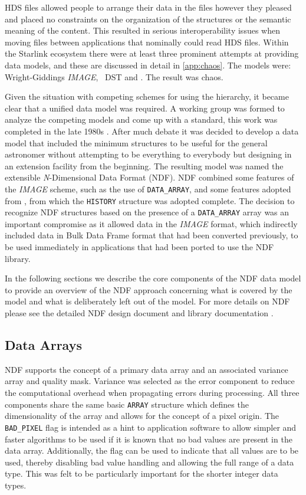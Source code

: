 \documentclass[final,authoryear,5p,times,twocolumn]{elsarticle}
\begin{document}
HDS files allowed people to arrange their data in the files however
they pleased and placed no constraints on the organization of the
structures or the semantic meaning of the content. This resulted in
serious interoperability issues when moving files between applications
that nominally could read HDS files. Within the Starlink ecosystem
there were at least three prominent attempts at providing data
models, and these are discussed in detail in \ref{app:chaos}. The
models were: Wright-Giddings \emph{IMAGE}, \figaro\ DST and \asterix.
The result was chaos.

Given the situation with competing schemes for using the hierarchy, it
became clear that a unified data model was required. A working group
was formed to analyze the competing models and come up with a standard, this work
was completed in the late 1980s \citep{1988STARB...2...11C,SGP38}.
After much debate it was decided to develop a data model that included
the minimum structures to be useful for the general astronomer without
attempting to be everything to everybody but designing in an extension
facility from the beginning. The resulting model was named the
extensible \emph{N}-Dimensional Data Format (NDF).  NDF combined some
features of the \emph{IMAGE} scheme, such as the use of
\texttt{DATA\_ARRAY}, and some features adopted from \asterix, from
which the \texttt{HISTORY} structure was adopted complete.  The
decision to recognize NDF structures based on the presence of a
\texttt{DATA\_ARRAY} array was an important compromise as it allowed
data in the \emph{IMAGE} format, which indirectly included data in
Bulk Data Frame \citep[BDF;][]{1980SPIE..264...70P,SUN4}
format that had been converted previously, to be used immediately
in applications that had been ported to use the NDF library.

In the following sections we describe the core components of the NDF
data model to provide an overview of the NDF approach concerning what
is covered by the model and what is deliberately left out of the
model. For more details on NDF please see the detailed NDF design
document \citep[SGP/38;][]{SGP38} and library documentation \citep[SUN/33;][]{SUN33}.

\subsection{Data Arrays}

NDF supports the concept of a primary data array and an associated
variance array and quality mask. Variance was selected as the error
component to reduce the computational overhead when propagating errors
during processing. All three components share the same
basic \texttt{ARRAY} structure which defines the dimensionality of the
array and allows for the concept of a pixel origin. The
\texttt{BAD\_PIXEL} flag is intended as a hint to application
software to allow simpler and faster algorithms to be used if it is known
that no bad values are present in the data array. Additionally, the flag
can be used to indicate that all values are to be used, thereby
disabling bad value handling and allowing the full range of a data
type. This was felt to be particularly important for the shorter
integer data types.
\end{document}
